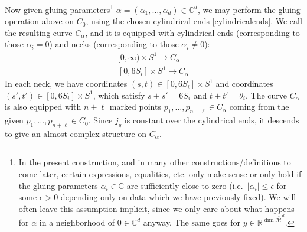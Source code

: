 \documentclass[12pt]{article}
\theoremstyle{definition}
\theoremstyle{remark}
\numberwithin{equation}{subsection}
\newcommand{\CC}{\mathbb C}
\newcommand{\RR}{\mathbb R}
\newcommand{\Mbar}{\overline{\mathcal M}}
\begin{document}
Now given gluing parameters\footnote{In the present construction, and in many other constructions/definitions to come later, certain expressions, equalities, etc. only make sense or only hold if the gluing parameters $\alpha_i\in\CC$ are sufficiently close to zero (i.e.\ $\left|\alpha_i\right|\leq\epsilon$ for some $\epsilon>0$ depending only on data which we have previously fixed).  We will often leave this assumption implicit, since we only care about what happens for $\alpha$ in a neighborhood of $0\in\CC^d$ anyway.  The same goes for $y\in\RR^{\dim\Mbar^d}$.} $\alpha=(\alpha_1,\ldots,\alpha_d)\in\CC^d$, we may perform the gluing operation above on $C_0$, using the chosen cylindrical ends \eqref{cylindricalends}.  We call the resulting curve $C_\alpha$, and it is equipped with cylindrical ends (corresponding to those $\alpha_i=0$) and necks (corresponding to those $\alpha_i\ne 0$):
\begin{align}
\label{Gend}[0,\infty)\times S^1\to C_\alpha\\
\label{Gneck}[0,6S_i]\times S^1\to C_\alpha
\end{align}
In each neck, we have coordinates $(s,t)\in[0,6S_i]\times S^1$ and coordinates $(s',t')\in[0,6S_i]\times S^1$, which satisfy $s+s'=6S_i$ and $t+t'=\theta_i$.  The curve $C_\alpha$ is also equipped with $n+\ell$ marked points $p_1,\ldots,p_{n+\ell}\in C_\alpha$ coming from the given $p_1,\ldots,p_{n+\ell}\in C_0$.  Since $j_y$ is constant over the cylindrical ends, it descends to give an almost complex structure on $C_\alpha$.
\end{document}
